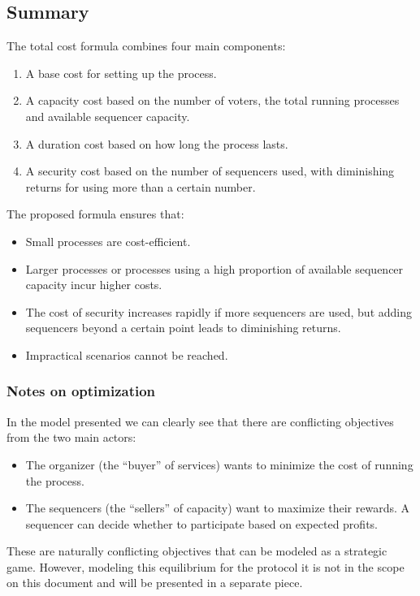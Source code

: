 \subsection{Summary}

The total cost formula combines four main components:

\begin{enumerate}
	\item A base cost for setting up the process.
	\item A capacity cost based on the number of voters, the total running processes and available sequencer capacity.
	\item A duration cost based on how long the process lasts.
	\item A security cost based on the number of sequencers used, with diminishing returns for using more than a certain number.
\end{enumerate}

The proposed formula ensures that:

\begin{itemize}
	\item Small processes are cost-efficient.
	\item Larger processes or processes using a high proportion of available sequencer capacity incur higher costs.
	\item The cost of security increases rapidly if more sequencers are used, but adding sequencers beyond a certain point leads to diminishing returns.
	\item Impractical scenarios cannot be reached.
\end{itemize}

\subsubsection{Notes on optimization}

In the model presented we can clearly see that there are conflicting objectives from the two main actors:

\begin{itemize}
	\item The organizer (the ``buyer'' of services) wants to minimize the cost of running the process.
	\item The sequencers (the ``sellers'' of capacity) want to maximize their rewards. A sequencer can decide whether to participate based on expected profits.
\end{itemize}

These are naturally conflicting objectives that can be modeled as a strategic game. However, modeling this equilibrium for the protocol it is not in the scope on this document and will be presented in a separate piece.
